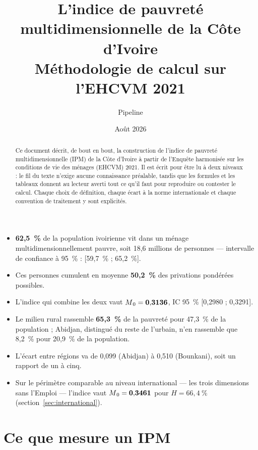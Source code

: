 \documentclass[11pt,a4paper]{article}
\title{\bfseries L'indice de pauvreté multidimensionnelle de la Côte d'Ivoire\\[4pt]
\large Méthodologie de calcul sur l'EHCVM 2021}
\author{Pipeline \col{PythonIPM}}
\date{Août 2026}
\begin{document}
\maketitle

\begin{abstract}
\noindent Ce document décrit, de bout en bout, la construction de l'indice de pauvreté
multidimensionnelle (IPM) de la Côte d'Ivoire à partir de l'Enquête harmonisée sur les conditions
de vie des ménages (EHCVM) 2021. Il est écrit pour être lu à deux niveaux : le fil du texte
n'exige aucune connaissance préalable, tandis que les formules et les tableaux donnent au lecteur
averti tout ce qu'il faut pour reproduire ou contester le calcul. Chaque choix de définition, chaque
écart à la norme internationale et chaque convention de traitement y sont explicités.
\end{abstract}

\begin{retenir}
\begin{itemize}
  \item \textbf{62,5~\%} de la population ivoirienne vit dans un ménage multidimensionnellement
        pauvre, soit 18,6 millions de personnes --- intervalle de confiance à 95~\% :
        [59,7~\% ; 65,2~\%].
  \item Ces personnes cumulent en moyenne \textbf{50,2~\%} des privations pondérées possibles.
  \item L'indice qui combine les deux vaut $M\textsubscript{0} = \mathbf{0{,}3136}$, IC 95~\%
        [0,2980 ; 0,3291].
  \item Le milieu rural rassemble \textbf{65,3~\%} de la pauvreté pour 47,3~\% de la population ;
        Abidjan, distingué du reste de l'urbain, n'en rassemble que 8,2~\% pour 20,9~\% de la
        population.
  \item L'écart entre régions va de 0,099 (Abidjan) à 0,510 (Bounkani), soit un rapport de
        un à cinq.
  \item Sur le périmètre comparable au niveau international --- les trois dimensions sans
        l'Emploi --- l'indice vaut $M\textsubscript{0} = \mathbf{0{,}3461}$ pour $H = 66{,}4~\%$
        (section~\ref{sec:international}).
\end{itemize}
\end{retenir}

\tableofcontents
\bigskip

\section{Ce que mesure un IPM}
\end{document}
